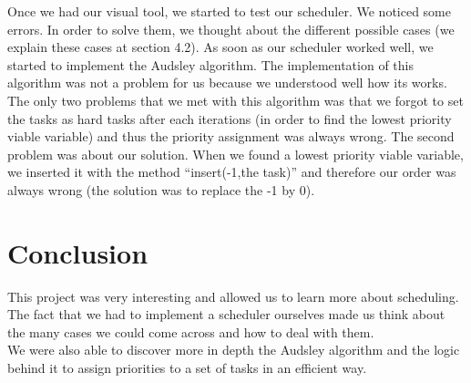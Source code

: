 \documentclass[a4paper,12pt]{article}
\begin{document}
\smallskip
\noindent
Once we had our visual tool, we started to test our scheduler. We noticed some errors. In order to solve them, we thought about the different possible cases (we explain these cases at section 4.2). As soon as our scheduler worked well, we started to implement the Audsley algorithm. The implementation of this algorithm was not a problem for us because we understood well how its works. The only two problems that we met with this algorithm was that we forgot to set the tasks as hard tasks after each iterations (in order to find the lowest priority viable variable) and thus the priority assignment was always wrong. The second problem was about our solution. When we found a lowest priority viable variable, we inserted it with the method ``insert(-1,the task)'' and therefore our order was always wrong (the solution was to replace the -1 by 0). 

\newpage

\section{Conclusion}
This project was very interesting and allowed us to learn more about scheduling. \\
The fact that we had to implement a scheduler ourselves made us think about the many cases we could come across and how to deal with them. \\
We were also able to discover more in depth the Audsley algorithm and the logic behind it to assign priorities to a set of tasks in an efficient way.
\end{document}
